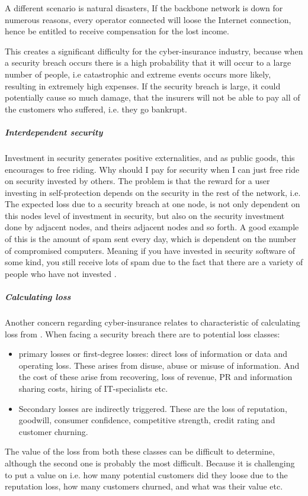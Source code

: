     
  A different scenario is natural disasters, If the backbone network is down for numerous reasons, 
 every operator connected will loose the Internet connection, 
 hence be entitled to receive compensation for the lost income.   
 
This creates a significant difficulty for the cyber-insurance industry, because
when a security breach occurs there is a high probability that it will occur to a large number of people, i.e catastrophic and extreme events occurs more likely, resulting in extremely high expenses.
If the security breach is large, it could potentially cause so much damage, that the insurers will not be able to pay all of the customers who suffered, i.e. they go bankrupt.\cite{bohme2010modeling} 

\subparagraph{Interdependent security}
Investment in security generates positive externalities, and as public goods, this encourages to free riding. Why should I pay for security when I can just free ride on security invested by others.  The problem is that the reward for a user investing in self-protection depends on the security in the rest of the network, i.e. The expected loss due to a security breach at one node, is not only
dependent on this nodes level of investment in security, but also on the security investment done
  by adjacent nodes, and theirs adjacent nodes and so forth. 
  A good example of this is the amount of spam sent every day, which is dependent on the number of compromised computers. Meaning if you have invested in security software of some kind, you still receive lots of spam due to the fact that there are a variety of people who have not invested \cite{towardsInsurable}.

\subparagraph{Calculating loss} Another concern regarding cyber-insurance relates to characteristic of calculating loss from \cite{mehr1980principles}. When facing a security breach there are to potential loss classes:\cite{bandyopadhyay2009managers} 
\begin{itemize}
\item primary losses or first-degree losses: direct loss of information or data and operating loss. 
These arises from disuse, abuse or misuse of information.
 And the cost of these arise from recovering, loss of revenue, 
 PR and information sharing costs, hiring of IT-specialists etc.
 \item Secondary losses are indirectly triggered. These are the loss of reputation, goodwill, 
consumer confidence, competitive strength, credit rating and customer churning. 
\end{itemize}
The value of the loss from both these classes can be difficult to determine, although the second one is probably the most difficult. Because it is challenging to put a value on i.e. how many potential customers did they loose due to the reputation loss, how many customers churned, and what was their value etc.

